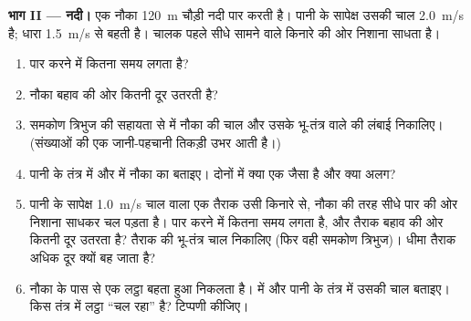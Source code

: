 \begin{problem}
\medskip
\noindent\textbf{भाग II --- नदी।}
एक नौका \qty{120}{m} चौड़ी नदी पार करती है। पानी के सापेक्ष उसकी चाल \qty{2.0}{m/s}
है; धारा \qty{1.5}{m/s} से बहती है। चालक पहले सीधे सामने वाले किनारे की ओर
निशाना साधता है।
\begin{enumerate}[resume]
  \item पार करने में कितना समय लगता है?
  \item नौका बहाव की ओर कितनी दूर उतरती है?
  \item समकोण त्रिभुज की सहायता से  में नौका की
        चाल और उसके भू-तंत्र वाले  की लंबाई निकालिए।
        (संख्याओं की एक जानी-पहचानी तिकड़ी उभर आती है।)
  \item पानी के तंत्र में और  में नौका का
         बताइए। दोनों में क्या एक जैसा है और क्या अलग?
  \item पानी के सापेक्ष \qty{1.0}{m/s} चाल वाला एक तैराक उसी किनारे से,
        नौका की तरह सीधे पार की ओर निशाना साधकर चल पड़ता है। पार करने
        में कितना समय लगता है, और तैराक बहाव की ओर कितनी दूर उतरता है?
        तैराक की भू-तंत्र चाल निकालिए (फिर वही समकोण त्रिभुज)। धीमा
        तैराक अधिक दूर क्यों बह जाता है?
  \item नौका के पास से एक लट्ठा बहता हुआ निकलता है।  में और पानी के तंत्र में उसकी चाल बताइए। किस तंत्र में
        लट्ठा ``चल रहा'' है? टिप्पणी कीजिए।
\end{enumerate}


\end{problem}
